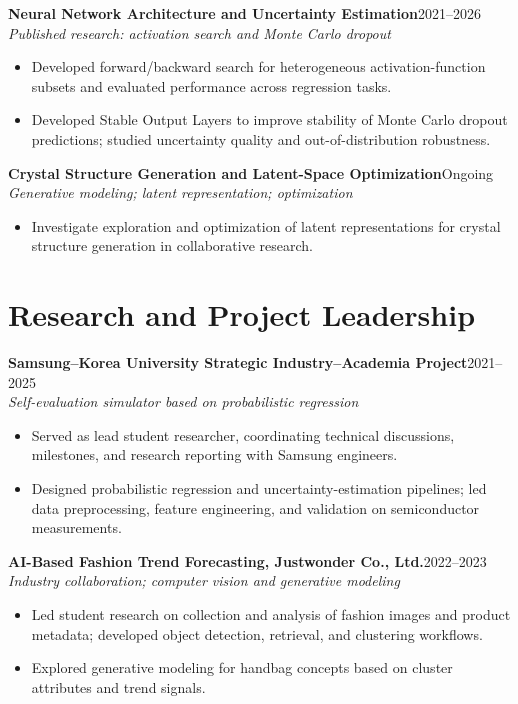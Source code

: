 \documentclass[a4paper,10pt]{article}
\newcommand{\project}[3]{\textbf{#1}\hfill{\small #2}\\[-1pt]{\small\textit{#3}}\par}
\newcommand{\tightgap}{\vspace{5pt}}
\begin{document}
\tightgap

\project{Neural Network Architecture and Uncertainty Estimation}
  {2021--2026}
  {Published research: activation search and Monte Carlo dropout}

\begin{itemize}
\item Developed forward/backward search for heterogeneous activation-function subsets and evaluated
  performance across regression tasks.
\item Developed Stable Output Layers to improve stability of Monte Carlo dropout predictions;
  studied uncertainty quality and out-of-distribution robustness.
\end{itemize}

\tightgap

\project{Crystal Structure Generation and Latent-Space Optimization}
  {Ongoing}
  {Generative modeling; latent representation; optimization}

\begin{itemize}
\item Investigate exploration and optimization of latent representations for crystal structure
  generation in collaborative research.
\end{itemize}

\newpage

\section{Research and Project Leadership}

\project{Samsung--Korea University Strategic Industry--Academia Project}
  {2021--2025}
  {Self-evaluation simulator based on probabilistic regression}

\begin{itemize}
\item Served as lead student researcher, coordinating technical discussions, milestones, and
  research reporting with Samsung engineers.
\item Designed probabilistic regression and uncertainty-estimation pipelines; led data
  preprocessing, feature engineering, and validation on semiconductor measurements.
\end{itemize}

\tightgap

\project{AI-Based Fashion Trend Forecasting, Justwonder Co., Ltd.}
  {2022--2023}
  {Industry collaboration; computer vision and generative modeling}

\begin{itemize}
\item Led student research on collection and analysis of fashion images and product metadata;
  developed object detection, retrieval, and clustering workflows.
\item Explored generative modeling for handbag concepts based on cluster attributes and trend
  signals.
\end{itemize}
\end{document}
